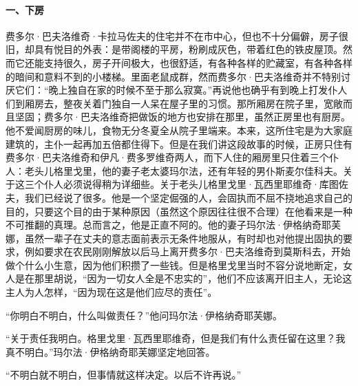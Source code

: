 \paragraph*{一、下房}
\par 费多尔·巴夫洛维奇·卡拉马佐夫的住宅并不在市中心，但也不十分偏僻，房子很旧，却具有悦目的外表：是带阁楼的平房，粉刷成灰色，带着红色的铁皮屋顶。然而它还能支持很久，房子开间极大，也很舒适，有各种各样的贮藏室，有各种各样的暗间和意料不到的小楼梯。里面老鼠成群，然而费多尔·巴夫洛维奇并不特别讨厌它们：“晚上独自在家的时候不至于那么寂寞。”再说他也确乎有到晚上打发仆人们到厢房去，整夜关着门独自一人呆在屋子里的习惯。那所厢房在院子里，宽敞而且坚固；费多尔·巴夫洛维奇把做饭的地方也安排在那里，虽然正房里也有厨房。他不爱闻厨房的味儿，食物无分冬夏全从院子里端来。本来，这所住宅是为大家庭建筑的，主仆一起再加五倍都住得下。但是在我们讲这段故事的时候，正房只住有费多尔·巴夫洛维奇和伊凡·费多罗维奇两人，而下人住的厢房里只住着三个仆人：老头儿格里戈里，他的妻子老太婆玛尔法，还有年轻的男仆斯麦尔佳科夫。关于这三个仆人必须说得稍为详细些。关于老头儿格里戈里·瓦西里耶维奇·库图佐夫，我们已经说了很多。他是一个坚定倔强的人，会固执而不屈不挠地追求自己的目的，只要这个目的由于某种原因（虽然这个原因往往很不合理）在他看来是一种不可推翻的真理。总而言之，他是正直不阿的。他的妻子玛尔法·伊格纳奇耶芙娜，虽然一辈子在丈夫的意志面前表示无条件地服从，有时却也对他提出固执的要求，例如要求在农民刚刚解放以后马上离开费多尔·巴夫洛维奇到莫斯科去，开始做个什么小生意，因为他们积攒了一些钱。但是格里戈里当时不容分说地断定，女人是在那里胡说，“因为一切女人全是不忠实的”，他们不应该离开旧主人，无论这主人为人怎样，“因为现在这是他们应尽的责任”。
\par “你明白不明白，什么叫做责任？”他问玛尔法·伊格纳奇耶芙娜。
\par “关于责任我明白。格里戈里·瓦西里耶维奇，但是我们有什么责任留在这里？我真不明白。”玛尔法·伊格纳奇耶芙娜坚定地回答。
\par “不明白就不明白，但事情就这样决定。以后不许再说。”
